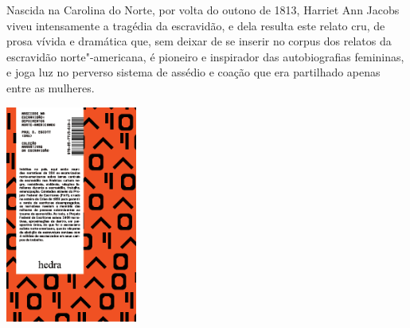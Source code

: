\hspace*{-7cm}\hrulefill\hspace*{-7cm}

\medskip

\noindent{}Nascida na Carolina do Norte, por volta do outono de 1813, Harriet Ann Jacobs viveu intensamente a tragédia da escravidão, e dela resulta este relato cru, de prosa vívida e dramática que, sem deixar de se inserir no corpus dos relatos da escravidão norte"-americana, é pioneiro e inspirador das autobiografias femininas, e joga luz no perverso sistema de assédio e coação que era partilhado apenas entre as mulheres.

\vfill

\hspace*{-.4cm}\begin{minipage}[c]{1\linewidth}
\small{
{}}
\end{minipage}


\pagebreak

\hspace{.5cm}

\begin{center}
\hspace*{-2.7cm}
\hspace*{2cm}\includegraphics[width=43mm]{./imgs/wpa.png}
\end{center}

